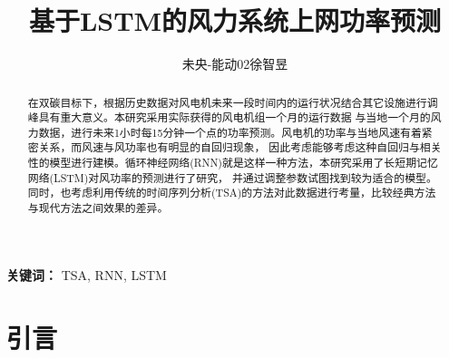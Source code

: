 \documentclass{ctexart}
\title{基于LSTM的风力系统上网功率预测}
\author{未央-能动02\quad 徐智昱\quad 2020012991}
\date{}
\begin{document}
\maketitle
\begin{abstract}
    在双碳目标下，根据历史数据对风电机未来一段时间内的运行状况结合其它设施进行调峰具有重大意义。本研究采用实际获得的风电机组一个月的运行数据
    与当地一个月的风力数据，进行未来1小时每15分钟一个点的功率预测。风电机的功率与当地风速有着紧密关系，而风速与风功率也有明显的自回归现象，
    因此考虑能够考虑这种自回归与相关性的模型进行建模。循环神经网络(RNN)就是这样一种方法，本研究采用了长短期记忆网络(LSTM)对风功率的预测进行了研究，
    并通过调整参数试图找到较为适合的模型。同时，也考虑利用传统的时间序列分析(TSA)的方法对此数据进行考量，比较经典方法与现代方法之间效果的差异。
\end{abstract}
\textbf{关键词：} TSA, RNN, LSTM
\section{引言}
\end{document}
